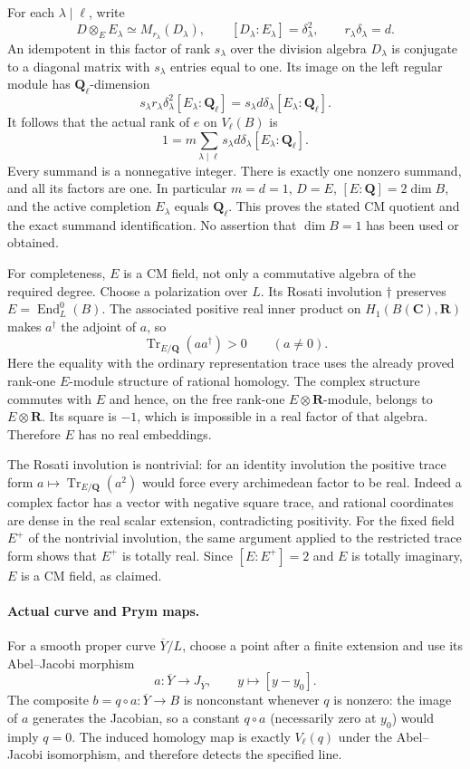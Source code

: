 For each $\lambda\mid\ell$, write
\[
 D\otimes_E E_\lambda\simeq M_{r_\lambda}(D_\lambda),\qquad
 [D_\lambda:E_\lambda]=\delta_\lambda^2,\qquad
 r_\lambda\delta_\lambda=d.
\]
An idempotent in this factor of rank $s_\lambda$ over the division
algebra $D_\lambda$ is conjugate to a diagonal matrix with
$s_\lambda$ entries equal to one. Its image on the left regular module
has $\mathbf Q_\ell$-dimension
\[
 s_\lambda r_\lambda\delta_\lambda^2[E_\lambda:\mathbf Q_\ell]
 =s_\lambda d\delta_\lambda[E_\lambda:\mathbf Q_\ell].
\]
It follows that the actual rank of $e$ on $V_\ell(B)$ is
\[
 1=m\sum_{\lambda\mid\ell}
 s_\lambda d\delta_\lambda[E_\lambda:\mathbf Q_\ell].
\]
Every summand is a nonnegative integer. There is exactly one nonzero
summand, and all its factors are one. In particular $m=d=1$,
$D=E$, $[E:\mathbf Q]=2\dim B$, and the active completion
$E_\lambda$ equals $\mathbf Q_\ell$. This proves the stated CM quotient
and the exact summand identification. No assertion that $\dim B=1$
has been used or obtained.

For completeness, $E$ is a CM field, not only a commutative algebra
of the required degree. Choose a polarization over $L$. Its Rosati
involution $\dagger$ preserves $E=\operatorname{End}^0_L(B)$.
The associated positive real inner product on $H_1(B(\mathbf C),\mathbf R)$
makes $a^\dagger$ the adjoint of $a$, so
\[
 \operatorname{Tr}_{E/\mathbf Q}(aa^\dagger)>0\qquad(a\ne0).
\]
Here the equality with the ordinary representation trace uses the
already proved rank-one $E$-module structure of rational homology.
The complex structure commutes with $E$ and hence, on the free
rank-one $E\otimes\mathbf R$-module, belongs to $E\otimes\mathbf R$.
Its square is $-1$, which is impossible in a real factor of that
algebra. Therefore $E$ has no real embeddings.

The Rosati involution is nontrivial: for an identity involution the
positive trace form $a\mapsto\operatorname{Tr}_{E/\mathbf Q}(a^2)$
would force every archimedean factor to be real. Indeed a complex
factor has a vector with negative square trace, and rational
coordinates are dense in the real scalar extension, contradicting
positivity. For the fixed field $E^+$ of the nontrivial involution,
the same argument applied to the restricted trace form shows that
$E^+$ is totally real. Since $[E:E^+]=2$ and $E$ is totally imaginary,
$E$ is a CM field, as claimed.

\paragraph{Actual curve and Prym maps.}
For a smooth proper curve $\overline Y/L$, choose a point after a finite
extension and use its Abel--Jacobi morphism
\[
 a:\overline Y\longrightarrow J_{\overline Y},\qquad
 y\longmapsto[y-y_0].
\]
The composite $b=q\circ a:\overline Y\to B$ is nonconstant whenever
$q$ is nonzero: the image of $a$ generates the Jacobian, so a constant
$q\circ a$ (necessarily zero at $y_0$) would imply $q=0$.
The induced homology map is exactly $V_\ell(q)$ under the Abel--Jacobi
isomorphism, and therefore detects the specified line.

